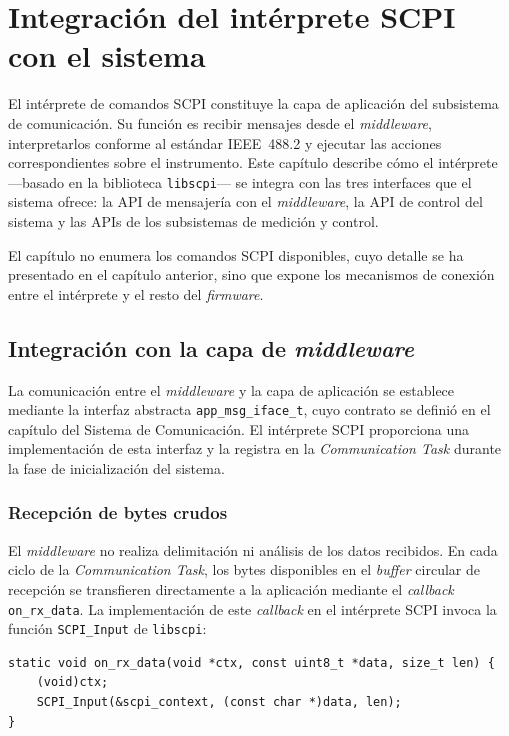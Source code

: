 \chapter{Integración del intérprete SCPI con el sistema}
\label{cp:integracion-scpi}

El intérprete de comandos SCPI constituye la capa de aplicación del subsistema
de comunicación. Su función es recibir mensajes desde el \textit{middleware},
interpretarlos conforme al estándar IEEE~488.2 y ejecutar las acciones
correspondientes sobre el instrumento. Este capítulo describe cómo el intérprete
—basado en la biblioteca \texttt{libscpi}— se integra con las tres interfaces
que el sistema ofrece: la API de mensajería con el \textit{middleware}, la API
de control del sistema y las APIs de los subsistemas de medición y control.

El capítulo no enumera los comandos SCPI disponibles, cuyo detalle se ha
presentado en el capítulo anterior, sino que expone los mecanismos de conexión
entre el intérprete y el resto del \textit{firmware}.

\section{Integración con la capa de \textit{middleware}}

La comunicación entre el \textit{middleware} y la capa de aplicación se
establece mediante la interfaz abstracta \texttt{app\_msg\_iface\_t}, cuyo
contrato se definió en el capítulo del Sistema de Comunicación. El intérprete
SCPI proporciona una implementación de esta interfaz y la registra en la
\textit{Communication Task} durante la fase de inicialización del sistema.

\subsection{Recepción de bytes crudos}

El \textit{middleware} no realiza delimitación ni análisis de los datos
recibidos. En cada ciclo de la \textit{Communication Task}, los bytes
disponibles en el \textit{buffer} circular de recepción se transfieren
directamente a la aplicación mediante el \textit{callback}
\texttt{on\_rx\_data}. La implementación de este \textit{callback} en el
intérprete SCPI invoca la función \texttt{SCPI\_Input} de \texttt{libscpi}:

\begin{verbatim}
static void on_rx_data(void *ctx, const uint8_t *data, size_t len) {
    (void)ctx;
    SCPI_Input(&scpi_context, (const char *)data, len);
}
\end{verbatim}

